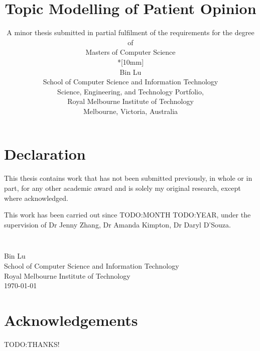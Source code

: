 \documentclass[11pt,twoside]{report}
\newcommand{\SubmissionDate}{\today}
\newcommand{\student}{Bin Lu}
\newcommand{\supervisor}{Dr Jenny Zhang, Dr Amanda Kimpton, Dr Daryl D'Souza}
\newcommand{\topic}{Topic Modelling of Patient Opinion}
\newcommand{\school}{School of Computer Science and Information Technology}
\newcommand{\program}{Masters of Computer Science}
\newcommand{\institution}{Royal Melbourne Institute of Technology}
\begin{document}
\title{{\Large\bf \topic}}
\author{
A minor thesis submitted in partial fulfilment of the requirements for the degree of
\\\program\\*[10mm]
\\\student
\\\school
\\Science, Engineering, and Technology Portfolio,
\\\institution
\\Melbourne, Victoria, Australia
}
\maketitle
\thispagestyle{empty}


\chapter*{Declaration}

This thesis contains work that has not been submitted previously, in
whole or in part, for any other academic award and is solely my
original research, except where acknowledged.

This work has been carried out since TODO:MONTH TODO:YEAR, under the
supervision of {\supervisor}.

\paragraph{}
\vspace{5cm}\noindent \\\student \\
\school\\
\institution\\
\SubmissionDate


\chapter*{Acknowledgements}

TODO:THANKS!

\tableofcontents
\listoffigures
\listoftables

\end{document}
